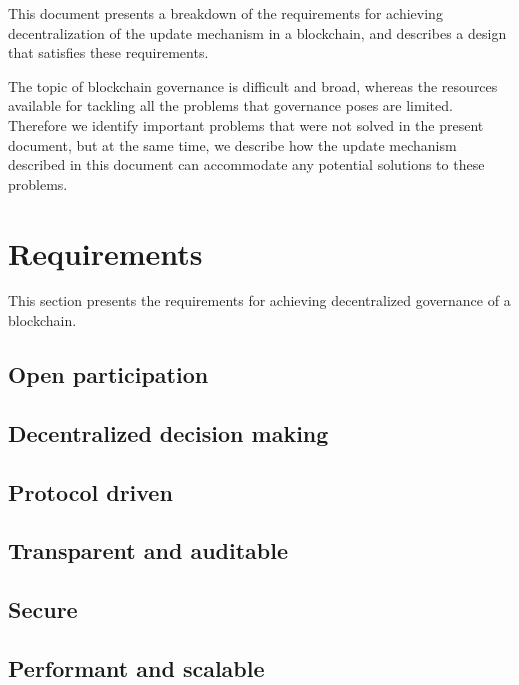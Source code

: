 \documentclass[11pt,a4paper]{article}
\begin{document}
This document presents a breakdown of the requirements for achieving
decentralization of the update mechanism in a blockchain, and describes a design
that satisfies these requirements.

The topic of blockchain governance is difficult and broad, whereas the resources
available for tackling all the problems that governance poses are limited.
Therefore we identify important problems that were not solved in the present
document, but at the same time, we describe how the update mechanism described
in this document can accommodate any potential solutions to these problems.


\section{Requirements}
\label{sec:requirements}

This section presents the requirements for achieving decentralized governance of
a blockchain.

\subsection{Open participation}
\label{sec:open-participation}

\subsection{Decentralized decision making}
\label{sec:decentr-decis-making}

\subsection{Protocol driven}
\label{sec:protocol-driven}

\subsection{Transparent and auditable}
\label{sec:transp-audit}

\subsection{Secure}
\label{sec:secure}

\subsection{Performant and scalable}
\label{sec:performant-scalable}
\end{document}
